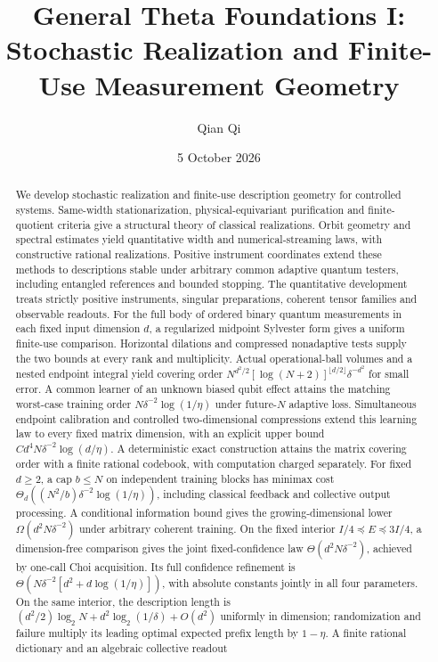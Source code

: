 \documentclass[11pt]{amsart}
\title[General Theta Foundations I]{General Theta Foundations I:\\Stochastic Realization and Finite-Use Measurement Geometry}
\author{Qian Qi}
\date{5 October 2026}
\numberwithin{equation}{section}
\theoremstyle{definition}\newtheorem{definition}[theorem]{Definition}
\theoremstyle{remark}\newtheorem{remark}[theorem]{Remark}
\begin{document}
\raggedbottom
\begin{abstract}
We develop stochastic realization and finite-use description geometry
for controlled systems. Same-width stationarization, physical-equivariant
purification and finite-quotient criteria give a structural theory of
classical realizations. Orbit geometry and spectral estimates yield
quantitative width and numerical-streaming laws, with constructive
rational realizations. Positive instrument coordinates extend these
methods to descriptions stable under arbitrary common adaptive quantum
testers, including entangled references and bounded stopping.
The quantitative development treats strictly positive instruments,
singular preparations, coherent tensor families and observable readouts.
For the full body of ordered binary quantum measurements in each fixed
input dimension $d$, a regularized midpoint Sylvester form gives a
uniform finite-use comparison. Horizontal dilations and compressed
nonadaptive tests supply the two bounds at every rank and multiplicity.
Actual operational-ball volumes and a nested endpoint integral yield
covering order
\mbox{$N^{d^2/2}[\log(N+2)]^{\lfloor d/2\rfloor}\delta^{-d^2}$}
for small error. A common learner of an unknown biased qubit effect
attains the matching worst-case training order
$N\delta^{-2}\log(1/\eta)$ under future-$N$ adaptive loss.
Simultaneous endpoint calibration and controlled two-dimensional
compressions extend this learning law to every fixed matrix dimension,
with an explicit upper bound $Cd^4N\delta^{-2}\log(d/\eta)$.
A deterministic exact construction attains the matrix covering order
with a finite rational codebook, with computation charged separately.
For fixed $d\ge2$, a cap $b\le N$ on independent training blocks
has minimax cost $\Theta_d((N^2/b)\delta^{-2}\log(1/\eta))$,
including classical feedback and collective output processing.
A conditional information bound gives the growing-dimensional lower
$\Omega(d^2N\delta^{-2})$ under arbitrary coherent training.
On the fixed interior $I/4\preceq E\preceq3I/4$, a dimension-free
comparison gives the joint fixed-confidence law
$\Theta(d^2N\delta^{-2})$, achieved by one-call Choi acquisition.
Its full confidence refinement is
\mbox{$\Theta(N\delta^{-2}[d^2+d\log(1/\eta)])$}, with absolute
constants jointly in all four parameters.
On the same interior, the description length is
$(d^2/2)\log_2N+d^2\log_2(1/\delta)+O(d^2)$ uniformly in
dimension; randomization and failure multiply its leading optimal
expected prefix length by $1-\eta$.
A finite rational dictionary and an algebraic collective readout

\end{abstract}
\end{document}
